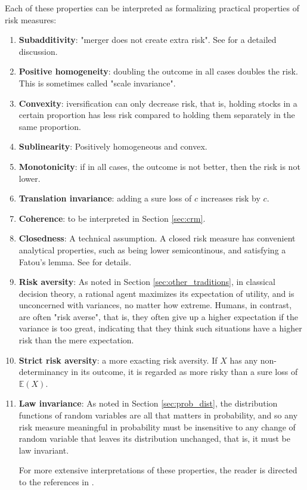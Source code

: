 Each of these properties can be interpreted as formalizing practical properties of risk measures:
\begin{enumerate}[(1)]
	\item \textbf{Subadditivity}: "merger does not create extra risk". See \cite{artznerCoherentMeasuresRisk1999} for a detailed discussion.
	\item \textbf{Positive homogeneity}: doubling the outcome in all cases doubles the risk. This is sometimes called "scale invariance".
	\item \textbf{Convexity}: iversification can only decrease risk, that is, holding stocks in a certain proportion has less risk compared to holding them separately in the same proportion.
	\item \textbf{Sublinearity}: Positively homogeneous and convex.
	\item \textbf{Monotonicity}: if in all cases, the outcome is not better, then the risk is not lower.
	\item \textbf{Translation invariance}: adding a sure loss of $c$ increases risk by $c$.
	\item \textbf{Coherence}: to be interpreted in Section \ref{sec:crm}.
	\item \textbf{Closedness}: A technical assumption. A closed risk measure has convenient analytical properties, such as being lower semicontinous, and satisfying a Fatou's lemma. See \cite[Theorem 2]{kusuokaLawInvariantCoherent2001} for details.
	\item \textbf{Risk aversity}: As noted in Section \ref{sec:other_traditions}, in classical decision theory, a rational agent maximizes its expectation of utility, and is unconcerned with variances, no matter how extreme. Humans, in contrast, are often "risk averse", that is, they often give up a higher expectation if the variance is too great, indicating that they think such situations have a higher risk than the mere expectation.
	\item \textbf{Strict risk aversity}: a more exacting risk aversity. If $X$ has any non-determinancy in its outcome, it is regarded as more risky than a sure loss of $\mathbb{E}(X)$.
	\item \textbf{Law invariance}: As noted in Section \ref{sec:prob_dist}, the distribution functions of random variables are all that matters in probability, and so any risk measure meaningful in probability must be insensitive to any change of random variable that leaves its distribution unchanged, that is, it must be law invariant.
	
For more extensive interpretations of these properties, the reader is directed to the references in \cite{gianinRiskMeasuresGexpectations2006}.

\end{enumerate}


